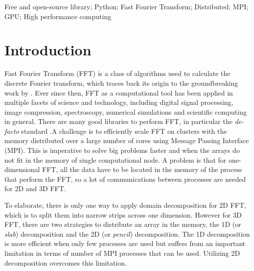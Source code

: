 
Free and open-source library; Python; Fast Fourier Transform; Distributed; MPI;
GPU; High performance computing%

\section{Introduction}


Fast Fourier Transform (FFT) is a class of algorithms used to calculate the
discrete Fourier transform, which traces back its origin to the groundbreaking
work by \citet{cooley_tukey}.
%
Ever since then, FFT as a computational tool has been applied in multiple
facets of science and technology, including digital signal processing, image
compression, spectroscopy, numerical simulations and scientific computing in
general. There are many good libraries to perform FFT, in particular the
\emph{de-facto} standard  \citep{frigo2005design}.\@ A challenge
is to efficiently scale FFT on clusters with the memory distributed over a
large number of cores using Message Passing Interface (MPI). This is imperative
to solve big problems faster and when the arrays do not fit in the memory of
single computational node.
%
A problem is that for one-dimensional FFT, all the data have to be located in the
memory of the process that perform the FFT, so a lot of communications between
processes are needed for 2D and 3D FFT.

To elaborate, there is only one way to apply domain decomposition for 2D FFT,
which is to split them into narrow strips across one dimension. However for 3D
FFT, there are two strategies to distribute an array in the memory, the 1D (or
\emph{slab}) decomposition and the 2D (or \emph{pencil}) decomposition. The 1D
decomposition is more efficient when only few processes are used but suffers
from an important limitation in terms of number of MPI processes that can be
used. Utilizing 2D decomposition overcomes this limitation.

